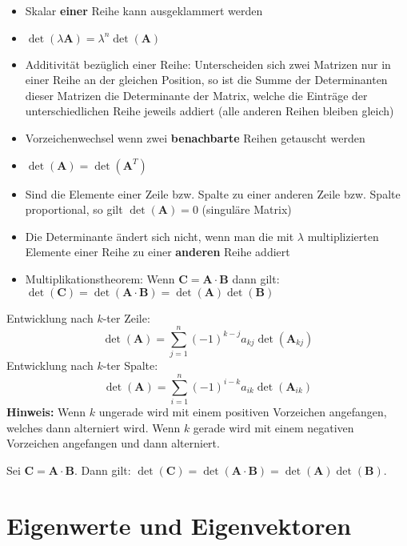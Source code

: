 \begin{itemize}
	\item Skalar \textbf{einer} Reihe kann ausgeklammert werden
	\item $\det(\lambda \mathbf{A}) = \lambda^n \det(\mathbf{A})$
	\item Additivität bezüglich einer Reihe: Unterscheiden sich zwei Matrizen nur in einer Reihe an der gleichen Position, so ist die Summe der Determinanten dieser Matrizen die Determinante der Matrix, welche die Einträge der unterschiedlichen Reihe jeweils addiert (alle anderen Reihen bleiben gleich)
	\item Vorzeichenwechsel wenn zwei \textbf{benachbarte} Reihen getauscht werden
	\item $\det(\mathbf{A}) = \det(\mathbf{A}^T)$
	\item Sind die Elemente einer Zeile bzw. Spalte zu einer anderen Zeile bzw. Spalte proportional, so gilt $\det(\mathbf{A}) = 0$ (singuläre Matrix)
	\item Die Determinante ändert sich nicht, wenn man die mit $\lambda$ multiplizierten Elemente einer Reihe zu einer \textbf{anderen} Reihe addiert
	\item Multiplikationstheorem: Wenn $\mathbf{C} = \mathbf{A} \cdot \mathbf{B}$ dann gilt: $\det(\mathbf{C}) = \det(\mathbf{A} \cdot \mathbf{B}) = \det(\mathbf{A}) \det(\mathbf{B})$
\end{itemize}


\begin{framedprop}
	Entwicklung nach $k$-ter Zeile:
	\[
	\det(\mathbf{A}) = \sum_{j=1}^{n} (-1)^{k-j} a_{kj} \det(\mathbf{A}_{kj})
	\]
	Entwicklung nach $k$-ter Spalte:
	\[
	\det(\mathbf{A}) = \sum_{i=1}^{n} (-1)^{i-k} a_{ik} \det(\mathbf{A}_{ik})
	\]
	\textbf{Hinweis:} Wenn $k$ ungerade wird mit einem positiven Vorzeichen angefangen, welches dann alterniert wird. Wenn $k$ gerade wird mit einem negativen Vorzeichen angefangen und dann alterniert.
\end{framedprop}

\begin{framedthm}[Multiplikationstheorem]
	Sei $\mathbf{C} = \mathbf{A} \cdot \mathbf{B}$. Dann gilt: $\det(\mathbf{C})= \det(\mathbf{A}\cdot\mathbf{B}) = \det(\mathbf{A}) \det(\mathbf{B})$.
\end{framedthm}

\section{Eigenwerte und Eigenvektoren}

